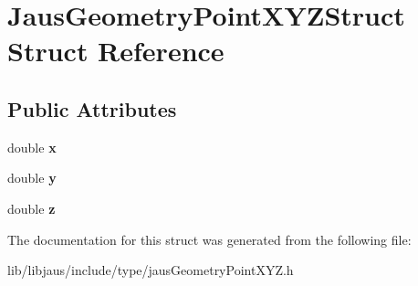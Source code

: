 \hypertarget{struct_jaus_geometry_point_x_y_z_struct}{\section{\-Jaus\-Geometry\-Point\-X\-Y\-Z\-Struct \-Struct \-Reference}
\label{struct_jaus_geometry_point_x_y_z_struct}
}
\subsection*{\-Public \-Attributes}
\begin{DoxyCompactItemize}
\item 
\hypertarget{struct_jaus_geometry_point_x_y_z_struct_ab1e2602b9c380f8a8e6f94fa559b37cc}{double {\bfseries x}}\label{struct_jaus_geometry_point_x_y_z_struct_ab1e2602b9c380f8a8e6f94fa559b37cc}

\item 
\hypertarget{struct_jaus_geometry_point_x_y_z_struct_a23d74ff57db27fb484a885b0fd0f9f0b}{double {\bfseries y}}\label{struct_jaus_geometry_point_x_y_z_struct_a23d74ff57db27fb484a885b0fd0f9f0b}

\item 
\hypertarget{struct_jaus_geometry_point_x_y_z_struct_a48ba47435c31707461b24198207605b6}{double {\bfseries z}}\label{struct_jaus_geometry_point_x_y_z_struct_a48ba47435c31707461b24198207605b6}

\end{DoxyCompactItemize}


\-The documentation for this struct was generated from the following file\-:\begin{DoxyCompactItemize}
\item 
lib/libjaus/include/type/jaus\-Geometry\-Point\-X\-Y\-Z.\-h\end{DoxyCompactItemize}
